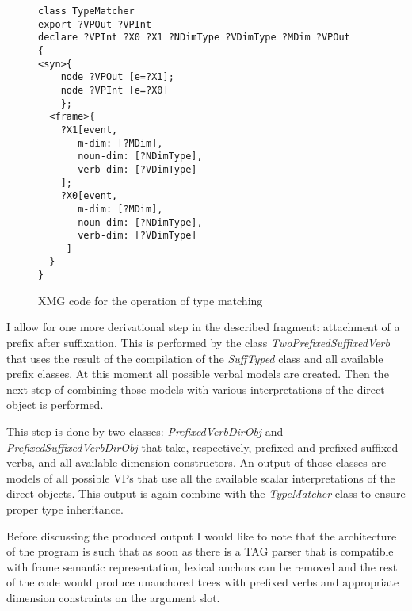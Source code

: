 \begin{figure}
\begin{verbatim}
class TypeMatcher
export ?VPOut ?VPInt
declare ?VPInt ?X0 ?X1 ?NDimType ?VDimType ?MDim ?VPOut
{
<syn>{
    node ?VPOut [e=?X1];
    node ?VPInt [e=?X0]
    };
  <frame>{
    ?X1[event,
       m-dim: [?MDim],
       noun-dim: [?NDimType],
       verb-dim: [?VDimType]
    ];
    ?X0[event,
       m-dim: [?MDim],
       noun-dim: [?NDimType],
       verb-dim: [?VDimType]
     ]
  }
}
\end{verbatim}
\caption{XMG code for the operation of type matching \label{xmg:typemather}}
\end{figure}

I allow for one more derivational step in the described fragment: attachment of a prefix after suffixation. This is performed by the class \textit{TwoPrefixedSuffixedVerb} that uses the result of the compilation of the \textit{SuffTyped} class and all available prefix classes. At this moment all possible verbal models are created. Then the next step of combining those models with various interpretations of the direct object is performed.

This step is done by two classes: \textit{PrefixedVerbDirObj} and \textit{PrefixedSuffixedVerbDirObj} that take, respectively, prefixed and prefixed-suffixed verbs, and all available dimension constructors. An output of those classes are models of all possible VPs that use all the available scalar interpretations of the direct objects. This output is again combine with the \textit{TypeMatcher} class to ensure proper type inheritance.

Before discussing the produced output I would like to note that the architecture of the program is such that as soon as there is a TAG parser that is compatible with frame semantic representation, lexical anchors can be removed and the rest of the code would produce unanchored trees with prefixed verbs and appropriate dimension constraints on the argument slot.

